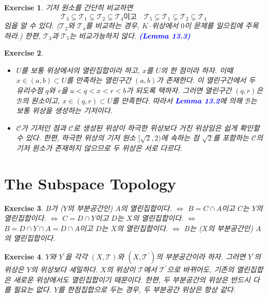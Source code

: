 \documentclass{article}
\newtheorem{exercise}{Exercise}[section]
\begin{document}
\newpage
\begin{exercise}
    기저 원소를 간단히 비교하면
    \[
    	\mathcal{T}_3\subsetneq\mathcal{T}_1\subsetneq\mathcal{T}_2\subsetneq\mathcal{T}_4\text{이고}\quad\mathcal{T}_5\subsetneq\mathcal{T}_1\subsetneq\mathcal{T}_2\subsetneq\mathcal{T}_4
	\]
	임을 알 수 있다. ($\mathcal{T}_2$와 $\mathcal{T}_4$를 비교하는 경우, $K$--위상에서 $0$이 문제를 일으킴에 주목하라.) 한편, $\mathcal{T}_3$과 $\mathcal{T}_5$는 비교가능하지 않다. \textcolor{blue}{\textbf{(Lemma 13.3)}}
\end{exercise}

\begin{exercise}
	\label{exc:13.8}
    \phantom{}
    \begin{itemize}
        \item[(a)] $U$를 보통 위상에서의 열린집합이라 하고, $x$를 $U$의 한 점이라 하자. 이때 $x\in(a,b)\subset U$를 만족하는 열린구간 $(a,b)$가 존재한다. 이 열린구간에서 두 유리수점 $q$와 $r$을 $a<q<x<r<b$가 되도록 택하자. 그러면 열린구간 $(q,r)$은 $\mathcal{B}$의 원소이고, $x\in(q,r)\subset U$를 만족한다. 따라서 \textcolor{blue}{\textbf{Lemma 13.2}}에 의해 $\mathcal{B}$는 보통 위상을 생성하는 기저이다.
        \item[(b)] $\mathcal{C}$가 기저인 점과 $\mathcal{C}$로 생성된 위상이 하극한 위상보다 거친 위상임은 쉽게 확인할 수 있다. 한편, 하극한 위상의 기저 원소 $[\sqrt2,2)$에 속하는 점 $\sqrt2$를 포함하는 $\mathcal{C}$의 기저 원소가 존재하지 않으므로 두 위상은 서로 다르다.
    \end{itemize}
\end{exercise}


\section{The Subspace Topology}

\begin{exercise}
    $B$가 ($Y$의 부분공간인) $A$의 열린집합이다. $\Longleftrightarrow$ $B=C\cap A$이고 $C$는 $Y$의 열린집합이다. $\Longleftrightarrow$ $C=D\cap Y$이고 $D$는 $X$의 열린집합이다. $\Longleftrightarrow$ $B=D\cap Y\cap A=D\cap A$이고 $D$는 $X$의 열린집합이다. $\Longleftrightarrow$ $B$는 ($X$의 부분공간인) $A$의 열린집합이다.
\end{exercise}

\begin{exercise}
    $Y$와 $Y^{\prime}$을 각각 $(X,\mathcal{T})$와 $(X,\mathcal{T}^{\prime})$의 부분공간이라 하자. 그러면 $Y^{\prime}$의 위상은 $Y$의 위상보다 세밀하다. $X$의 위상이 $\mathcal{T}$에서 $\mathcal{T}^{\prime}$으로 바뀌어도, 기존의 열린집합은 새로운 위상에서도 열린집합이기 때문이다. 한편, 두 부분공간의 위상은 반드시 다를 필요는 없다. $Y$를 한점집합으로 두는 경우, 두 부분공간 위상은 항상 같다.
\end{exercise}
\end{document}
